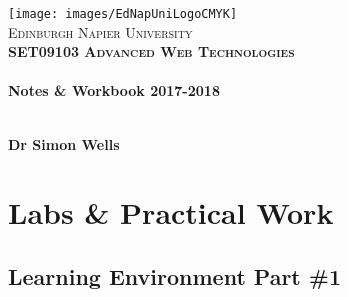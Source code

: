 \documentclass[12pt, a4paper, twoside]{book}
\begin{document}
\frontmatter

\begin{titlepage}
\vspace*{5cm}
\begin{center}
\texttt{[image: images/EdNapUniLogoCMYK]}~\\[1cm]

\textsc{\Large Edinburgh Napier University}\\[1.5cm]

\textsc{\LARGE \bfseries SET09103 Advanced Web Technologies}\\[0.5cm]

\hrulefill \\[0.4cm]
{\huge \bfseries Notes \& Workbook 2017-2018 \\[0.4cm] }
\hrulefill \\[1.5cm]

\begin{minipage}{0.4\textwidth}
\begin{flushleft} \large
\textbf{Dr Simon Wells} \\
\end{flushleft}
\end{minipage}

\vfill

\end{center}
\end{titlepage}


\setcounter{tocdepth}{2}
\cleardoublepage
\tableofcontents
\listoffigures
{}

\mainmatter



\part{Labs \& Practical Work}
\chapter{Learning Environment Part \#1}
\label{lab1}
\end{document}
